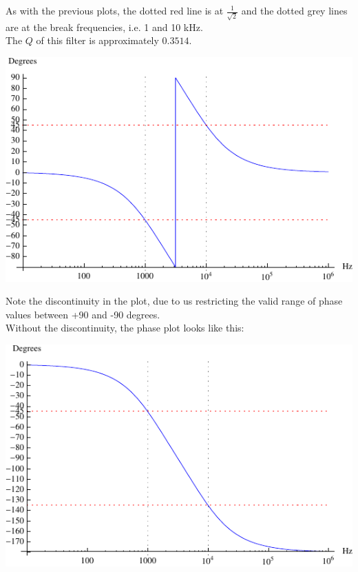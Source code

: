 \documentclass[12pt,a4paper]{report}
\begin{document}
As with the previous plots, the dotted red line is at $\displaystyle \frac{1}{\sqrt{2}}$ and the dotted grey lines are at the break frequencies, i.e. 1 and 10 kHz.\\
The $Q$ of this filter is approximately $0.3514$.

\includegraphics[scale=1.4]{Graphics/bsf_phase_plot}

Note the discontinuity in the plot, due to us restricting the valid range of phase values between +90 and -90 degrees.\\
Without the discontinuity, the phase plot looks like this:

\includegraphics[scale=1.4]{Graphics/bsf_phase_plot_no_disc}
\end{document}
